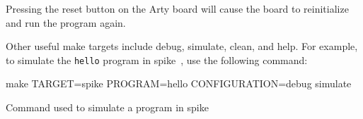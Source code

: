 Pressing the reset button on the Arty board will cause the board to reinitialize and run the program again.

Other useful make targets include debug, simulate, clean, and help.
For example, to simulate the \texttt{hello} program in \gls{spike}~\cite{SpikeSimulator}, use the following command:

\begin{listing}[h!tbp]
  \begin{bashsource}
    make TARGET=spike PROGRAM=hello CONFIGURATION=debug simulate
  \end{bashsource}
  \caption{Command used to simulate a program in \gls{spike}}
  \label{lst:simulate_in_spike}
\end{listing}


